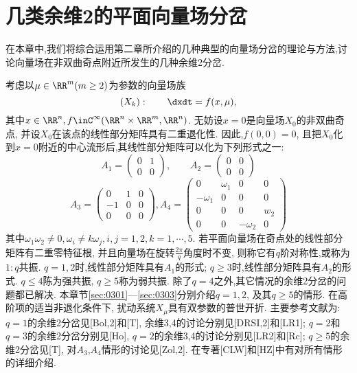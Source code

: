 \section{几类余维2的平面向量场分岔}
\label{part:03}
在本章中,我们将综合运用第二章所介绍的几种典型的向量场分岔的理论与方法,讨论向量场在非双曲奇点附近所发生的几种余维2分岔.
\par
考虑以$\mu \in \RR^m(m\geq 2)$为参数的向量场族
\begin{equation*}
\left(X_{k}\right): \qquad \dxdt =f(x, \mu),
\end{equation*}
其中$x\in\RR^n,f\inC^{\infty}(\RR^n\times \RR^m,\RR^n)$.
无妨设$x=0$是向量场$X_{0}$的非双曲奇点,
并设$X_{0}$在该点的线性部分矩阵具有二重退化性.
因此,$f(0,0)=0$,
且把$X_0$化到$x=0$附近的中心流形后,其线性部分矩阵可以化为下列形式之一:\\
$$A_{1}=\left(\begin{array}{ll}{0} & {1} \\ {0} & {0}\end{array}\right), \quad \quad A_{2}=\left(\begin{array}{ll}{0} & {0} \\ {0} & {0}\end{array}\right)$$
$$A_{3}=\left(\begin{array}{ccc}{0} & {1} & {0} \\ {- 1} & {0} & {0} \\ {0} & {0} & {0}\end{array}\right), A_{4}=\left(\begin{array}{cccc}{0} & {\omega_{1}} & {0} & {0} \\ {-\omega_{1}} & {0} & {0} & {0} \\ {0} & {0} & {0} & {w_{2}} \\ {0} & {0} & {-\omega_{2}} & {0}\end{array}\right)$$
其中$\omega_{1} \omega_{2} \neq 0, \omega_{i} \neq k \omega_{j}, i, j=1,2, k=1, \cdots, 5$.
若平面向量场在奇点处的线性部分矩阵有二重零特征根,
并且向量场在旋转$\frac{2\pi}{q}$角度时不变,
则称它有$q$阶对称性,或称为$1:q$共振.
$q=1,2$时,线性部分矩阵具有$A_1$的形式;
$q\geq3$时,线性部分矩阵具有$A_2$的形式.
$q\leq4$陈为强共振,
$q\geq 5$称为弱共振.
除了$q=4$之外,其它情况的余维2分岔的问题都已解决.
本章节\ref{sec:0301}---\ref{sec:0303}分别介绍$q=1,2$,
及其$q\geq 5$的情形.
在高阶项的适当非退化条件下,
扰动系统$X_{\mu}$具有双参数的普世开折.
主要参考文献为:$q=1$的余维2分岔见[Bol,2]和[T],
余维3,4的讨论分别见[DRSI,2]和[LR1];
$q=2$和$q=3$的余维2分岔分别见[Ho],
$q=2$的余维3,4的讨论分别见[LR2]和[Rc];
$q\geq 5$的余维2分岔见[T],
对$A_3$,$A_4$情形的讨论见[Zol,2].
在专著[CLW]和[HZ]中有对所有情形的详细介绍.
